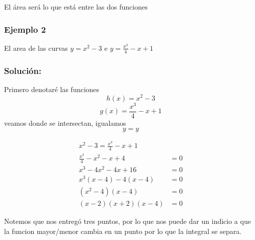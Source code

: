 \documentclass[12pt]{article}
\begin{document}
El área será lo que está entre las dos funciones

\subsubsection*{Ejemplo 2}
El area de las curvas $y=x^2-3$ e $y=\frac{x^3}{4}-x+1$
\subsubsection*{Solución:}
Primero denotaré las funciones
$$h(x)=x^2-3$$
$$g(x)=\frac{x^3}{4}-x+1$$
veamos donde se intersectan, igualamos $$y=y$$

\begin{center}
\begin{align*}
x^2 - 3 = \frac{x^3}{4} - x + 1 \\
\frac{x^3}{4} - x^2 - x + 4 &= 0 \\
x^3 - 4x^2 - 4x + 16 &= 0 \\
x^3(x - 4) - 4(x - 4) &= 0 \\
(x^2 - 4)(x - 4) &= 0 \\
(x - 2)(x + 2)(x - 4) &= 0
\end{align*}
\end{center}

Notemos que nos entregó tres puntos, por lo que nos puede dar un indicio a que la funcion mayor/menor cambia en un punto por lo que la integral se separa.
\end{document}
